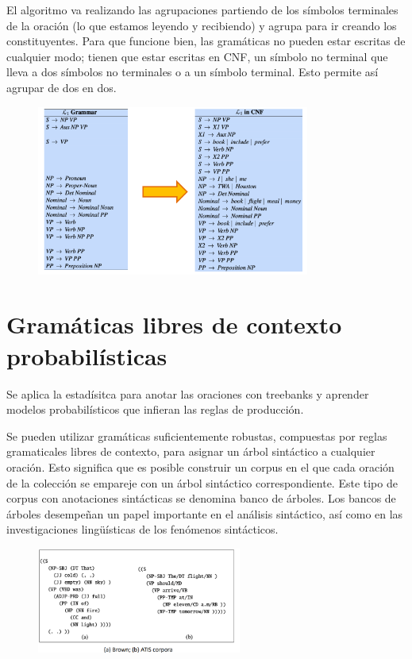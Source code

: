 El algoritmo va realizando las agrupaciones partiendo de los símbolos terminales de la oración (lo que estamos leyendo y recibiendo) y agrupa para ir creando los constituyentes. Para que funcione bien, las gramáticas no pueden estar escritas de cualquier modo; tienen que estar escritas en CNF, un símbolo no terminal que lleva a dos símbolos no terminales o a un símbolo terminal. Esto permite así agrupar de dos en dos.

\begin{figure}[h]
\centering
\includegraphics[width = 0.8\textwidth]{figs/cnf.png}
\end{figure}

\section{Gramáticas libres de contexto probabilísticas}
Se aplica la estadísitca para anotar las oraciones con treebanks y aprender modelos probabilísticos que infieran las reglas de producción. 

Se pueden utilizar gramáticas suficientemente robustas, compuestas por reglas gramaticales libres de contexto, para asignar un árbol sintáctico a cualquier oración. Esto significa que es posible construir un corpus en el que cada oración de la colección se empareje con un árbol sintáctico correspondiente. Este tipo de corpus con anotaciones sintácticas se denomina banco de árboles. Los bancos de árboles desempeñan un papel importante en el análisis sintáctico, así como en las investigaciones lingüísticas de los fenómenos sintácticos.

\begin{figure}[h]
\centering
\includegraphics[width = 0.6\textwidth]{figs/treebank.png}
\end{figure}

